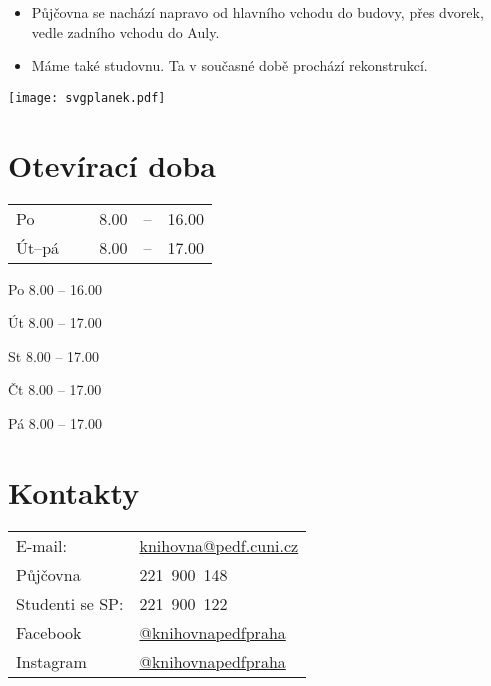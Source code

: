 
\begin{itemize}[leftmargin=0pt, topsep=0pt]
\item  Půjčovna se nachází napravo od hlavního vchodu
  do budovy, přes dvorek, vedle zadního vchodu do Auly.
\item Máme také studovnu. Ta v současné době prochází rekonstrukcí.  %
\end{itemize}

\texttt{[image: svgplanek.pdf]}

\newpage
\section{Otevírací doba}

\noindent{}

\ifdefined\HCode
\begin{tabular}{lllll}
  Po      & ~ & 8.00 &--& 16.00\\
  Út--pá  & ~ & 8.00 &--& 17.00
\end{tabular}

\else
Po 8.00 -- 16.00

Út 8.00 -- 17.00

St 8.00 -- 17.00

Čt 8.00 -- 17.00

Pá 8.00 -- 17.00
\fi



\newpage
\section{Kontakty}

\begin{tabular}{@{}ll@{}}
  E-mail:& \url{knihovna@pedf.cuni.cz}\\

  Půjčovna & 221~900~148\\

  Studenti se SP:& 221~900~122\\
  Facebook & \url{@knihovnapedfpraha}\\
  Instagram & \url{@knihovnapedfpraha}
\end{tabular}

